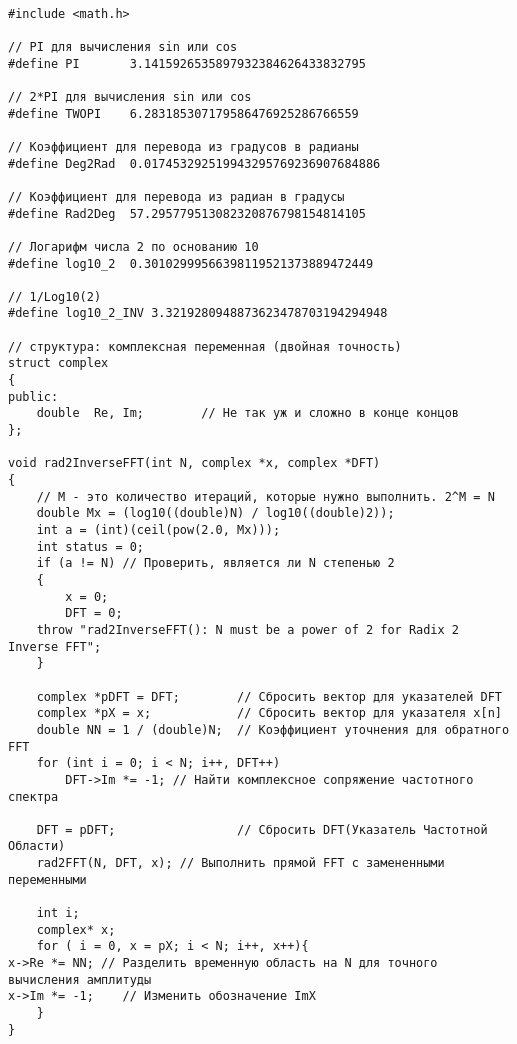 \vspace{\baselineskip}
\begin{tcolorbox}
\begin{verbatim}

#include <math.h>

// PI для вычисления sin или cos
#define PI       3.1415926535897932384626433832795

// 2*PI для вычисления sin или cos
#define TWOPI    6.283185307179586476925286766559

// Коэффициент для перевода из градусов в радианы
#define Deg2Rad  0.017453292519943295769236907684886

// Коэффициент для перевода из радиан в градусы
#define Rad2Deg  57.295779513082320876798154814105

// Логарифм числа 2 по основанию 10 
#define log10_2  0.30102999566398119521373889472449

// 1/Log10(2)
#define log10_2_INV 3.3219280948873623478703194294948

// структура: комплексная переменная (двойная точность) 
struct complex 
{ 
public:    
	double  Re, Im;        // Не так уж и сложно в конце концов 
};

void rad2InverseFFT(int N, complex *x, complex *DFT)
{    
	// M - это количество итераций, которые нужно выполнить. 2^M = N	
	double Mx = (log10((double)N) / log10((double)2));    
	int a = (int)(ceil(pow(2.0, Mx)));
	int status = 0;    
	if (a != N) // Проверить, является ли N степенью 2   
	{        
		x = 0;        
		DFT = 0;        
    throw "rad2InverseFFT(): N must be a power of 2 for Radix 2 Inverse FFT";
	}

	complex *pDFT = DFT;        // Сбросить вектор для указателей DFT    
	complex *pX = x;            // Сбросить вектор для указателя x[n]
	double NN = 1 / (double)N;  // Коэффициент уточнения для обратного FFT 
	for (int i = 0; i < N; i++, DFT++)        
		DFT->Im *= -1; // Найти комплексное сопряжение частотного спектра

	DFT = pDFT;                 // Сбросить DFT(Указатель Частотной Области)    
	rad2FFT(N, DFT, x); // Выполнить прямой FFT с замененными переменными

	int i;    
	complex* x;    
	for ( i = 0, x = pX; i < N; i++, x++){        
x->Re *= NN; // Разделить временную область на N для точного вычисления амплитуды        
x->Im *= -1;    // Изменить обозначение ImX
	}    
}

\end{verbatim}
\end{tcolorbox}

